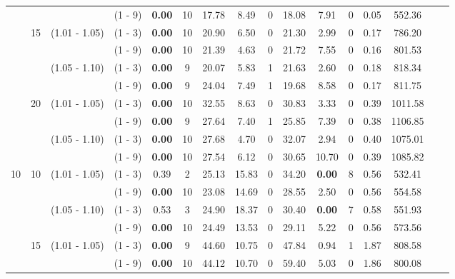 \documentclass[a4paper,11pt]{article}
\begin{document}
\begin{table}[ht]
\begin{tabular}{cccccccccccccccc}
 &  &  & 				 (1 - 9)  &  \textbf{0.00}  & 10 &		17.78      &  8.49  	    &  0	&  18.08      &  7.91 &		0     &  0.05      &  552.36  \\
 & 	15 & (1.01 - 1.05) & (1 - 3)  &  \textbf{0.00}  & 10 &		20.90      &  6.50  	    &  0	&  21.30      &  2.99 &		0     &  0.17      &  786.20  \\
 &  &  & 				 (1 - 9)  &  \textbf{0.00}  & 10 &		21.39      &  4.63 		    &  0	&  21.72      &  7.55 &		0     &  0.16      &  801.53  \\
 &  & 	 (1.05 - 1.10) & (1 - 3)  &  \textbf{0.00}  & 9 &		20.07      &  5.83  	    &  1    &  21.63      &  2.60 &		0     &  0.18      &  818.34  \\
 &  &  & 				 (1 - 9)  &  \textbf{0.00}  & 9 &		24.04      &  7.49  	    &  1	&  19.68      &  8.58 &		0     &  0.17      &  811.75  \\
 & 	20 & (1.01 - 1.05) & (1 - 3)  &  \textbf{0.00} & 10 &		32.55      &  8.63  	    &  0	&  30.83      &  3.33 &		0     &  0.39      &  1011.58 \\
 &  &  & 				 (1 - 9)  &  \textbf{0.00} & 9 &		27.64      &  7.40  	    &  1	&  25.85      &  7.39 &		0     &  0.38      &  1106.85 \\
 &  & 	 (1.05 - 1.10) & (1 - 3)  &  \textbf{0.00} & 10 &		27.68      &  4.70  	    &  0	&  32.07      &  2.94 &		0     &  0.40      &  1075.01 \\
 &  &  & 				 (1 - 9)  &  \textbf{0.00} & 10 &		27.54      &  6.12  	    &  0	&  30.65      &  10.70 &		0  	 &  0.39      &  1085.82 \\
10& 10 & (1.01 - 1.05) & (1 - 3)  &  0.39  		   &  2&		25.13      &  15.83  	    &  0	&  34.20      &  \textbf{0.00} &	8 &  0.56      &  532.41 \\
 &  &  & 				 (1 - 9)  &  \textbf{0.00}  & 10&		23.08      &  14.69  	    &  0	&  28.55      &  2.50  &	0	  &     0.56      &  554.58 \\
 &  & 	 (1.05 - 1.10) & (1 - 3)  &  0.53  		   &  3&		24.90      &  18.37  	    &  0	&  30.40      &  \textbf{0.00} & 7 &   0.58      &  551.93 \\
 &  &  & 				 (1 - 9)  &  \textbf{0.00}  & 10 &		24.49      &  13.53  	    &  0	&  29.11      &  5.22  & 0 	&  0.56      &  573.56 \\
 & 15 &  (1.01 - 1.05) & (1 - 3)  &  \textbf{0.00}  & 9 &		44.60      &  10.75  	    &  0	&  47.84      &  0.94  & 1 	&  1.87      &  808.58 \\
 &  &  & 				 (1 - 9)  &  \textbf{0.00}  & 10 &		44.12      &  10.70  	    &  0	&  59.40      &  5.03  & 0 	&  1.86      &  800.08 \\

\end{tabular}
\end{table}
\end{document}
